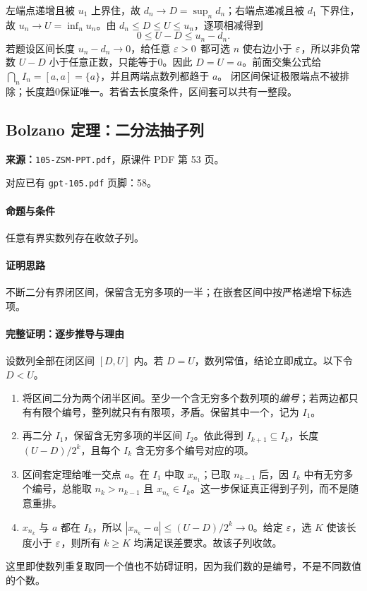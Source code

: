 左端点递增且被 $u_1$ 上界住，故 $d_n\to D=\sup_n d_n$；右端点递减且被 $d_1$ 下界住，故 $u_n\to U=\inf_n u_n$。由 $d_n\le D\le U\le u_n$，逐项相减得到
\[0\le U-D\le u_n-d_n.\]
若题设区间长度 $u_n-d_n\to0$，给任意 $\varepsilon>0$ 都可选 $n$ 使右边小于 $\varepsilon$，所以非负常数 $U-D$ 小于任意正数，只能等于0。因此 $D=U=a$。前面交集公式给 $\bigcap_nI_n=[a,a]=\{a\}$，并且两端点数列都趋于 $a$。
闭区间保证极限端点不被排除；长度趋0保证唯一。若省去长度条件，区间套可以共有一整段。

\clearpage\subsection{Bolzano 定理：二分法抽子列}
\textbf{来源：}\texttt{105-ZSM-PPT.pdf}，原课件 PDF 第 53 页。\par
对应已有 \texttt{gpt-105.pdf} 页脚：58。\par
\paragraph{命题与条件}任意有界实数列存在收敛子列。
\paragraph{证明思路}不断二分有界闭区间，保留含无穷多项的一半；在嵌套区间中按严格递增下标选项。
\paragraph{完整证明：逐步推导与理由}

设数列全部在闭区间 $[D,U]$ 内。若 $D=U$，数列常值，结论立即成立。以下令 $D<U$。
\begin{enumerate}
\item 将区间二分为两个闭半区间。至少一个含无穷多个数列项的\emph{编号}；若两边都只有有限个编号，整列就只有有限项，矛盾。保留其中一个，记为 $I_1$。
\item 再二分 $I_1$，保留含无穷多项的半区间 $I_2$。依此得到 $I_{k+1}\subseteq I_k$，长度 $(U-D)/2^k$，且每个 $I_k$ 含无穷多个编号对应的项。
\item 区间套定理给唯一交点 $a$。在 $I_1$ 中取 $x_{n_1}$；已取 $n_{k-1}$ 后，因 $I_k$ 中有无穷多个编号，总能取 $n_k>n_{k-1}$ 且 $x_{n_k}\in I_k$。这一步保证真正得到子列，而不是随意重排。
\item $x_{n_k}$ 与 $a$ 都在 $I_k$，所以 $|x_{n_k}-a|\le(U-D)/2^k\to0$。给定 $\varepsilon$，选 $K$ 使该长度小于 $\varepsilon$，则所有 $k\ge K$ 均满足误差要求。故该子列收敛。
\end{enumerate}
这里即使数列重复取同一个值也不妨碍证明，因为我们数的是编号，不是不同数值的个数。

